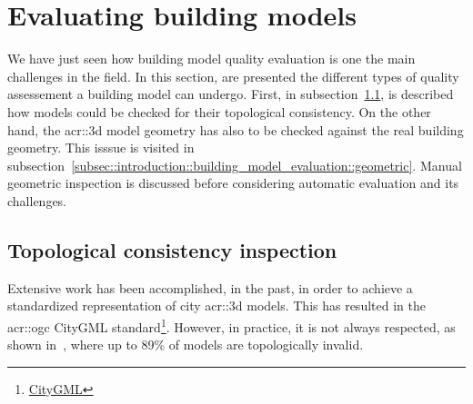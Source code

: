 \section{Evaluating building models}
    \label{sec::introduction::building_model_evaluation}
    We have just seen how building model quality evaluation is one the main challenges in the field.
    In this section, are presented the different types of quality assessement a building model can undergo.
    First, in subsection~\ref{subsec::introduction::building_model_evaluation::topological}, is described how models could be checked for their topological consistency.
    On the other hand, the \gls{acr::3d} model geometry has also to be checked against the real building geometry.
    This isssue is visited in subsection~\ref{subsec::introduction::building_model_evaluation::geometric}.
    Manual geometric inspection is discussed before considering automatic evaluation and its challenges.

    \subsection{Topological consistency inspection}
        \label{subsec::introduction::building_model_evaluation::topological}
        Extensive work has been accomplished, in the past, in order to achieve a standardized representation of city \gls{acr::3d} models.
        This has resulted in the \gls{acr::ogc} CityGML standard\footnote{\href{https://www.opengeospatial.org/standards/citygml}{CityGML}}.
        However, in practice, it is not always respected, as shown in~\textcite{biljecki2016most}, where up to 89\% of models are topologically invalid.\\

